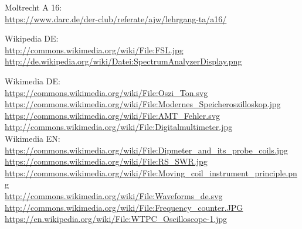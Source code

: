 \begin{thebibliography}{}
    Moltrecht A 16: \\
    \url{https://www.darc.de/der-club/referate/ajw/lehrgang-ta/a16/}

      Wikipedia DE: \\
    \url{http://commons.wikimedia.org/wiki/File:FSL.jpg}\\
    \url{http://de.wikipedia.org/wiki/Datei:SpectrumAnalyzerDisplay.png}

   Wikimedia DE:\\
    \url{https://commons.wikimedia.org/wiki/File:Oszi_Ton.svg}\\
    \url{https://commons.wikimedia.org/wiki/File:Modernes_Speicheroszilloskop.jpg}\\
    \url{https://commons.wikimedia.org/wiki/File:AMT_Fehler.svg}\\
    \url{http://commons.wikimedia.org/wiki/File:Digitalmultimeter.jpg}\\

   Wikimedia EN:\\
    \url{https://commons.wikimedia.org/wiki/File:Dipmeter_and_its_probe_coils.jpg}\\
    \url{https://commons.wikimedia.org/wiki/File:RS_SWR.jpg}\\
    \url{https://commons.wikimedia.org/wiki/File:Moving_coil_instrument_principle.png}\\
    \url{http://commons.wikimedia.org/wiki/File:Waveforms_de.svg}
    \url{http://commons.wikimedia.org/wiki/File:Frequency_counter.JPG}\\
    \url{https://en.wikipedia.org/wiki/File:WTPC_Oscilloscope-1.jpg}\\

\end{thebibliography}


